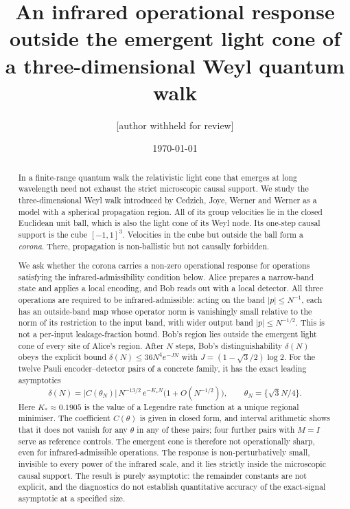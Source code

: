 \documentclass[11pt]{amsart}
\theoremstyle{definition}
\theoremstyle{remark}
\begin{document}
\title[Infrared response outside the emergent light cone]{An infrared operational response outside the emergent light cone of a three-dimensional Weyl quantum walk}

\author{[author withheld for review]}
\address{[withheld]}
\email{[withheld]}

\date{\today}

\begin{abstract}
In a finite-range quantum walk the relativistic light cone that emerges at
long wavelength need not exhaust the strict microscopic causal support.  We
study the three-dimensional Weyl walk introduced by Cedzich, Joye, Werner and
Werner as a model with a spherical propagation region.  All of its group
velocities lie in the closed Euclidean unit ball, which is also the light
cone of its Weyl node.  Its one-step causal support is the cube $[-1,1]^3$.
Velocities in the cube but outside the ball form a \emph{corona}.  There,
propagation is non-ballistic but not causally forbidden.

We ask whether the corona carries a non-zero operational response for
operations satisfying the infrared-admissibility condition below.
Alice prepares a narrow-band state and applies a local
encoding, and Bob reads out with a local detector.  All three operations are
required to be infrared-admissible: acting on the band $|p|\le N^{-1}$, each
has an outside-band map whose operator norm is vanishingly small relative
to the norm of its restriction to the input band, with wider output band
$|p|\le N^{-1/2}$. This is not a per-input leakage-fraction bound. Bob's
region lies outside the emergent light cone of every site of Alice's region.
After $N$ steps, Bob's distinguishability $\delta(N)$ obeys the explicit
bound $\delta(N)\le 36N^4e^{-JN}$ with $J=(1-\sqrt3/2)\log 2$.  For the twelve
Pauli encoder--detector pairs of a concrete family, it has the exact leading
asymptotics
\[
\delta(N)=\bigl|C(\theta_N)\bigr|\,N^{-13/2}\,e^{-K_*N}\bigl(1+O(N^{-1/2})\bigr),
\qquad \theta_N=\{\sqrt3N/4\}.
\]
Here $K_*\approx0.1905$ is the value of a Legendre rate function at a unique
regional minimiser.  The coefficient $C(\theta)$ is given in closed form, and
interval arithmetic shows that it does not vanish for any $\theta$ in any of
these pairs; four further pairs with $M=I$ serve as reference controls.  The emergent cone is therefore not operationally sharp,
even for infrared-admissible operations.  The response is non-perturbatively
small, invisible to every power of the infrared scale, and it lies strictly
inside the microscopic causal support.  The result is purely asymptotic: the
remainder constants are not explicit, and the diagnostics do not establish
quantitative accuracy of the exact-signal asymptotic at a specified size.
\end{abstract}
\end{document}

